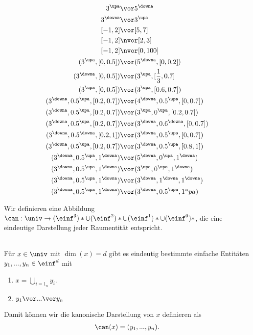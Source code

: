 \begin{bsp}
    \begin{align*}
        3^\upa &\vor 5^\downa\\
        3^\downa &\vor 3^\upa\\
        [-1,2] &\vor [5,7]\\
        [-1,2] &\nvor [2,3]\\
        [-1,2] &\nvor [0,100]\\
        (3^\upa, [0,0.5]) &\vor (5^\downa, [0,0.2])\\
        (3^\downa, [0,0.5]) &\vor (3^\upa, [\frac{1}{3}, 0.7]\\
        (3^\upa, [0,0.5]) &\vor (3^\upa, [0.6,0.7])\\
        (3^\downa,0.5^\upa,[0.2, 0.7]) &\vor (4^\downa,0.5^\upa,[0, 0.7])\\
        (3^\downa,0.5^\upa,[0.2, 0.7]) &\vor (3^\upa,0^\upa,[0.2, 0.7])\\
        (3^\downa,0.5^\upa,[0.2, 0.7]) &\vor (3^\downa,0.6^\downa,[0, 0.7])\\
        (3^\downa,0.5^\downa,[0.2, 1]) &\vor (3^\downa,0.5^\upa,[0, 0.7])\\
        (3^\downa,0.5^\upa,[0.2, 0.7]) &\vor (3^\downa,0.5^\upa,[0.8, 1])\\
        (3^\downa,0.5^\upa,1^\downa) &\vor (5^\downa,0^\upa,1^\downa)\\
        (3^\downa,0.5^\upa,1^\downa) &\vor (3^\upa,0^\upa,1^\downa)\\
        (3^\downa,0.5^\upa,1^\downa) &\vor (3^\downa,1^\downa,1^\downa)\\
        (3^\downa,0.5^\upa,1^\downa) &\vor (3^\downa,0.5^\upa,1^upa)
    \end{align*}
\end{bsp}


Wir definieren eine Abbildung $\can: \univ \to (\einf^3)* \cup (\einf^2)* \cup (\einf^1)* \cup (\einf^0)*$, die eine eindeutige Darstellung jeder Raumentität entspricht.

\begin{dfn}\ \\
    Für $x \in \univ$ mit $\dim(x) = d$ gibt es eindeutig bestimmte einfache Entitäten $y_1, ..., y_n \in \einf^d$ mit
    \begin{enumerate}
        \item $x = \bigcup_{i=1}_n y_i$.
        \item $y_1 \vor ... \vor y_n$
    \end{enumerate}
    Damit können wir die kanonische Darstellung von $x$ definieren als
    \begin{align*}
        \can(x) = (y_1, ... , y_n).
    \end{align*}
\end{dfn}


